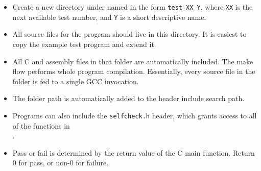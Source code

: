 \begin{itemize}
\item Create a new directory under  named
    in the form {\tt test\_XX\_Y}, where {\tt XX} is the next available
    test number, and {\tt Y} is a short descriptive name.

\item All source files for the program should live in this directory.
    It is easiest to copy the example test program and extend it.

\item All C and assembly files in that folder are automatically included.
    The make flow performs whole program compilation. Essentially,
    every source file in the folder is fed to a single GCC invocation.

\item The folder path is automatically added to the header include
    search path.

\item Programs can also include the {\tt selfcheck.h} header, which
    grants access to all of the functions in\\
    .

\item Pass or fail is determined by the return value of the C main function.
    Return $0$ for pass, or non-$0$ for failure.
\end{itemize}

